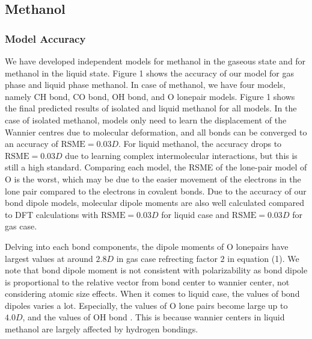 
\subsection{Methanol}
\subsubsection{Model Accuracy}
We have developed independent models for methanol in the gaseous state and for methanol in the liquid state. Figure 1 shows the accuracy of our model for gas phase and liquid phase methanol. In case of methanol, we have four models, namely CH bond, CO bond, OH bond, and O lonepair models. Figure 1 shows the final predicted results of isolated and liquid methanol for all models. In the case of isolated methanol, models only need to learn the displacement of the Wannier centres due to molecular deformation, and all bonds can be converged to an accuracy of $\mathrm{RSME}=\si{0.03}{D}$. For liquid methanol, the accuracy drops to $\mathrm{RSME}=\si{0.03}{D}$ due to learning complex intermolecular interactions, but this is still a high standard. Comparing each model, the RSME of the lone-pair model of O is the worst, which may be due to the easier movement of the electrons in the lone pair compared to the electrons in covalent bonds. Due to the accuracy of our bond dipole models, molecular dipole moments are also well calculated compared to DFT calculations with $\mathrm{RSME}=\si{0.03}{D}$ for liquid case and $\mathrm{RSME}=\si{0.03}{D}$ for gas case. 

Delving into each bond components, the dipole moments of O lonepairs have largest values at around $\si{2.8}{D}$ in gas case refrecting factor $2$ in equation (1).  We note that bond dipole moment is not consistent with polarizability as bond dipole is proportional to the relative vector from bond center to wannier center, not considering atomic size effects. When it comes to liquid case, the values of bond dipoles varies a lot. Especially, the values of O lone pairs become large up to $\si{4.0}{D}$, and the values of OH bond . This is because wannier centers in liquid methanol are largely affected by hydrogen bondings.


